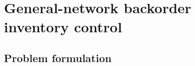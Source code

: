 %
%

\section{General-network backorder inventory control}
\label{sec:genbackorder}

\subsection{Problem formulation}
\label{sec:genbackorder-formulation}

